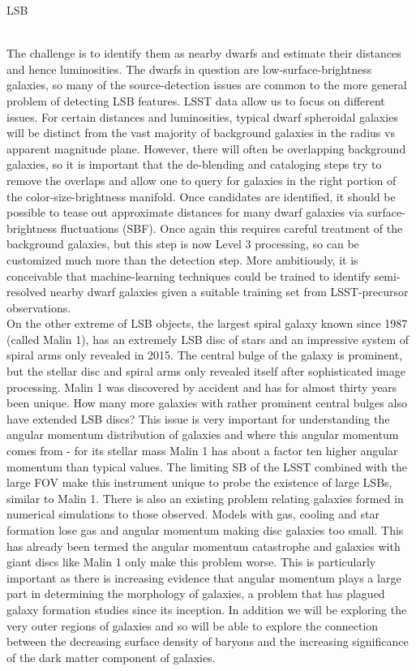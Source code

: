 \begin{tasklist}{LSB}
\begin{task}
{\\
The challenge is to identify them as nearby dwarfs and estimate their distances and hence luminosities. The dwarfs in question are low-surface-brightness galaxies, so many of the source-detection issues are common to the more general problem of detecting LSB features. LSST data allow us to focus on different issues. For certain distances and luminosities, typical dwarf spheroidal galaxies will be distinct from the vast majority of background galaxies in the radius vs apparent magnitude plane. However, there will often be overlapping background galaxies, so it is important that the de-blending and cataloging steps try to remove the overlaps and allow one to query for galaxies in the right portion of the color-size-brightness manifold. Once candidates are identified, it should be possible to tease out approximate distances for many dwarf galaxies via surface-brightness fluctuations (SBF). Once again this requires careful treatment of the background galaxies, but this step is now Level 3 processing, so can be customized much more than the detection step. More ambitiously, it is conceivable that machine-learning techniques could be trained to identify semi-resolved nearby dwarf galaxies given a suitable training set from LSST-precursor observations.
\\
On the other extreme of LSB objects, the largest spiral galaxy known since 1987 (called Malin 1), has an extremely LSB disc of stars and an impressive system of spiral arms only revealed in 2015. The central bulge of the galaxy is prominent, but the stellar disc and spiral arms only revealed itself after sophisticated image processing. Malin 1 was discovered by accident and has for almost thirty years been unique. How many more galaxies with rather prominent central bulges also have extended LSB discs? This issue is very important for understanding the angular momentum distribution of galaxies and where this angular momentum comes from - for its stellar mass Malin 1 has about a factor ten higher angular momentum than typical values. The limiting SB of the LSST combined with the large FOV make this instrument unique to probe the existence of large LSBs, similar to Malin 1. There is also an existing problem relating galaxies formed in numerical simulations to those observed. Models with gas, cooling and star formation lose gas and angular momentum making disc galaxies too small. This has already been termed the angular momentum catastrophe and galaxies with giant discs like Malin 1 only make this problem worse. This is particularly important as there is increasing evidence that angular momentum plays a large part in determining the morphology of galaxies, a problem that has plagued galaxy formation studies since its inception.  In addition we will be exploring the very outer regions of galaxies and so will be able to explore the connection between the decreasing surface density of baryons and the increasing significance of the dark matter component of galaxies.
}
\end{task}
\end{tasklist}
